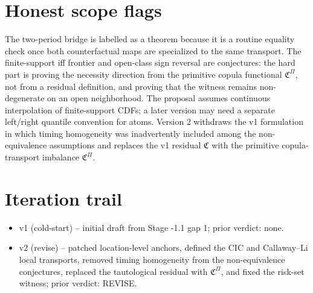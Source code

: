 \documentclass[11pt]{article}
\theoremstyle{definition}
\theoremstyle{plain}
\theoremstyle{remark}
\begin{document}
\section{Honest scope flags}
The two-period bridge is labelled as a theorem because it is a routine equality check once both counterfactual maps are specialized to the same transport. The finite-support iff frontier and open-class sign reversal are conjectures: the hard part is proving the necessity direction from the primitive copula functional \(\mathfrak C^{\Pi}\), not from a residual definition, and proving that the witness remains non-degenerate on an open neighborhood. The proposal assumes continuous interpolation of finite-support CDFs; a later version may need a separate left/right quantile convention for atoms. Version 2 withdraws the v1 formulation in which timing homogeneity was inadvertently included among the non-equivalence assumptions and replaces the v1 residual \(\mathfrak C\) with the primitive copula-transport imbalance \(\mathfrak C^{\Pi}\).

\section{Iteration trail}
\begin{itemize}[leftmargin=*]
\item v1 (cold-start) -- initial draft from Stage -1.1 gap 1; prior verdict: none.
\item v2 (revise) -- patched location-level anchors, defined the CIC and Callaway--Li local transports, removed timing homogeneity from the non-equivalence conjectures, replaced the tautological residual with \(\mathfrak C^{\Pi}\), and fixed the risk-set witness; prior verdict: REVISE.
\end{itemize}
\end{document}
